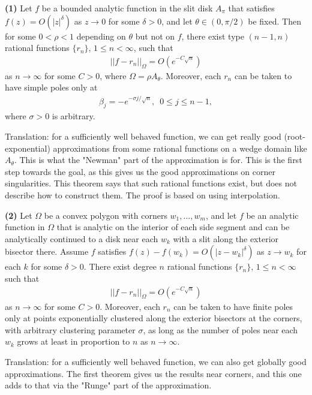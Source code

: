\documentclass[12]{article}
\begin{document}
	\textbf{(1)} Let $f$ be a bounded analytic function in the slit disk $A_\pi$ that satisfies $f(z)=O(|z|^\delta)$ as $z \to 0$ for some $\delta > 0$, and let $\theta \in (0,\pi /2)$ be fixed. Then for some $0< \rho < 1$ depending on $\theta$ but not on $f$, there exist type $(n-1,n)$ rational functions $\{r_n\}$, $1 \leq n < \infty$, such that
	\begin{align*}
	||f-r_n||_\Omega = O(e^{-C \sqrt{n}})
	\end{align*}
as $n \to \infty $ for some $C>0$, where $\Omega = \rho A_\theta$. Moreover, each $r_n$ can be taken to have simple poles only at
	\begin{align*}
	\beta_j = -e^{-\sigma j/\sqrt{n}}, \enspace 0\leq j \leq n-1,
	\end{align*}
where $\sigma >0$ is arbitrary.

	Translation: for a sufficiently well behaved function, we can get really good (root-exponential) approximations from some rational functions on a wedge domain like $A_\theta$. This is what the "Newman" part of the approximation is for. This is the first step towards the goal, as this gives us the good approximations on corner singularities. This theorem says that such rational functions exist, but does not describe how to construct them. The proof is based on using interpolation. 
	
	\textbf{(2)} Let $\Omega$ be a convex polygon with corners $w_1 , \ldots , w_m$, and let $f$ be an analytic function in $\Omega$ that is analytic on the interior of each side segment and can be analytically continued to a disk near each $w_k$ with a slit along the exterior bisector there. Assume $f$ satisfies $f(z)-f(w_k)=O(|z-w_k|^\delta)$ as $z \to w_k$ for each $k$ for some $\delta >0$. There exist degree $n$ rational functions $\{r_n\},\, 1 \leq n < \infty$ such that
	\begin{align*}
	||f-r_n||_\Omega=O(e^{-C\sqrt{n}})
	\end{align*}
as $n\to \infty$ for some $C>0$. Moreover, each $r_n$ can be taken to have finite poles only at points exponentially clustered along the exterior bisectors at the corners, with arbitrary clustering parameter $\sigma$, as long as the number of poles near each $w_k$ grows at least in proportion to $n$ as $n\to \infty$.

	Translation: for a sufficiently well behaved function, we can also get globally good approximations. The first theorem gives us the results near corners, and this one adds to that via the "Runge" part of the approximation.
	
\end{document}
